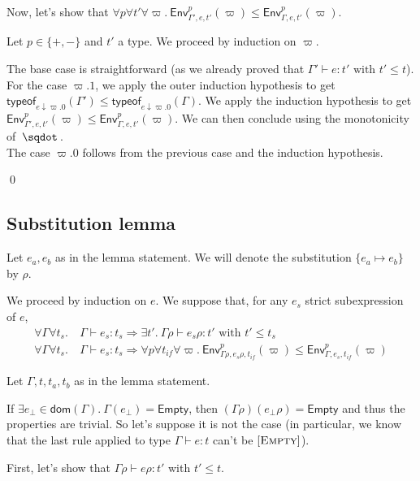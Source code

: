 \documentclass[a4paper]{article}%
\newcommand{\worra}[2]{#1\mathop{\,\sqdot\,} #2}
\newcommand{\dom}[1]{\textsf{dom}(#1)}
\newcommand{\Empty} {\textsf{Empty}}%
\newcommand{\subst}[2]{\{#1 \mapsto #2\}}
\newcommand{\tyof}[2]{\textsf{typeof}_{#2}(#1)}
\newcommand{\Gp}[2]{\textsf{Env}^{#1}_{#2}}
\theoremstyle{definition}
\newcommand {\Rule}[1] {[\textsc{#1}]}
\begin{document}
        Now, let's show that $\forall p \forall t' \forall \varpi.\ \Gp p {\Gamma',e,t'} (\varpi) \leq \Gp p {\Gamma,e,t'} (\varpi)$.
    
        Let $p\in \{+,-\}$ and $t'$ a type.
        We proceed by induction on $\varpi$.
        
        The base case is straightforward (as we already proved that $\Gamma' \vdash e:t' \text{ with } t' \leq t$).\\
        For the case $\varpi.1$, we apply the outer induction hypothesis to get $\tyof {\Gamma'} {e\downarrow\varpi.0} \leq \tyof {\Gamma} {e\downarrow\varpi.0}$.
        We apply the induction hypothesis to get $\Gp p {\Gamma',e,t'} (\varpi) \leq \Gp p {\Gamma,e,t'} (\varpi)$. We can then conclude using the monotonicity of $\worra {} {}$.\\
        The case $\varpi.0$ follows from the previous case and the induction hypothesis.
    
        \qed
    
        \subsection{Substitution lemma}
    
        Let $e_a,e_b$ as in the lemma statement. We will denote the substitution $\subst {e_a} {e_b}$ by $\rho$.
    
        We proceed by induction on $e$. We suppose that, for any $e_s$ strict subexpression of $e$,
        \begin{align*}
          \forall \Gamma \forall t_s.\ &\Gamma \vdash e_s:t_s \Rightarrow \exists t'.\ \Gamma \rho \vdash e_s \rho:t' \text{ with } t'\leq t_s\\
          \forall \Gamma \forall t_s.\ &\Gamma \vdash e_s:t_s \Rightarrow \forall p \forall t_{if} \forall \varpi.\ \Gp p {\Gamma\rho,e_s\rho,t_{if}} (\varpi) \leq \Gp p {\Gamma,e_s,t_{if}} (\varpi)
        \end{align*}
    
        Let $\Gamma,t,t_a,t_b$ as in the lemma statement.
    
        If $\exists e_\bot \in \dom {\Gamma}.\ \Gamma(e_\bot) = \Empty$, then $(\Gamma\rho)(e_\bot\rho) = \Empty$ and thus the properties are trivial.
        So let's suppose it is not the case (in particular, we know that the last rule applied to type $\Gamma \vdash e:t$ can't be $\Rule{Empty}$).
    
        First, let's show that $\Gamma \rho \vdash e \rho:t'$ with $t'\leq t$.
    
\end{document}
